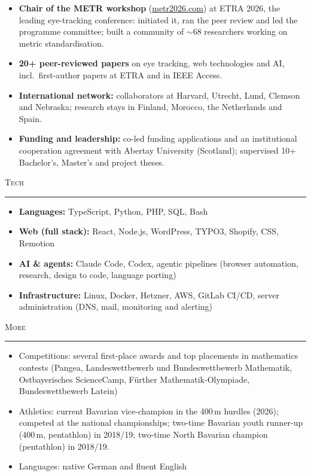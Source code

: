 \documentclass[10pt,a4paper]{article}
\newcommand{\cvsection}[1]{%
  \vspace{5pt}%
  {\large\scshape #1}\par
  \vspace{1pt}\hrule\vspace{4pt}%
}
\begin{document}
\begin{itemize}
  \item \textbf{Chair of the METR workshop} (\href{https://metr2026.com}{metr2026.com}) at ETRA 2026, the leading eye-tracking conference: initiated it, ran the peer review and led the programme committee; built a community of $\sim$68 researchers working on metric standardisation.
  \item \textbf{20+ peer-reviewed papers} on eye tracking, web technologies and AI, incl.\ first-author papers at ETRA and in IEEE Access.
  \item \textbf{International network:} collaborators at Harvard, Utrecht, Lund, Clemson and Nebraska; research stays in Finland, Morocco, the Netherlands and Spain.
  \item \textbf{Funding and leadership:} co-led funding applications and an institutional cooperation agreement with Abertay University (Scotland); supervised 10+ Bachelor's, Master's and project theses.
\end{itemize}

\cvsection{Tech}

\begin{itemize}
  \item \textbf{Languages:} TypeScript, Python, PHP, SQL, Bash
  \item \textbf{Web (full stack):} React, Node.js, WordPress, TYPO3, Shopify, CSS, Remotion
  \item \textbf{AI \& agents:} Claude Code, Codex, agentic pipelines (browser automation, research, design to code, language porting)
  \item \textbf{Infrastructure:} Linux, Docker, Hetzner, AWS, GitLab CI/CD, server administration (DNS, mail, monitoring and alerting)
\end{itemize}

\cvsection{More}

\begin{itemize}
  \item Competitions: several first-place awards and top placements in mathematics contests (Pangea, Landeswettbewerb und Bundeswettbewerb Mathematik, Ostbayerisches ScienceCamp, Fürther Mathematik-Olympiade, Bundeswettbewerb Latein)
  \item Athletics: current Bavarian vice-champion in the 400\,m hurdles (2026); competed at the national championships; two-time Bavarian youth runner-up (400\,m, pentathlon) in 2018/19; two-time North Bavarian champion (pentathlon) in 2018/19.
  \item Languages: native German and fluent English
\end{itemize}
\end{document}
